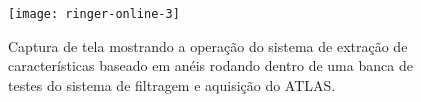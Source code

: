 \begin{figure}
\begin{center}
\texttt{[image: ringer-online-3]}
\end{center}
\caption{Captura de tela mostrando a operação do sistema de extração de
características baseado em anéis rodando dentro de uma banca de testes do
sistema de filtragem e aquisição do ATLAS.}
\label{fig:ringer-screenshot}
\end{figure}

